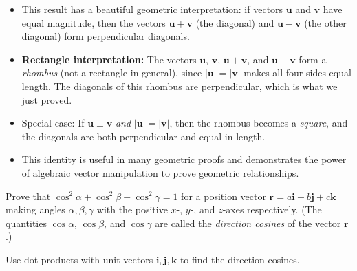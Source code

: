 \begin{takeaways}
\begin{itemize}[leftmargin=*]
\item This result has a beautiful geometric interpretation: if vectors $\mathbf{u}$ and $\mathbf{v}$ have equal magnitude, then the vectors $\mathbf{u} + \mathbf{v}$ (the diagonal) and $\mathbf{u} - \mathbf{v}$ (the other diagonal) form perpendicular diagonals.

\item \textbf{Rectangle interpretation:} The vectors $\mathbf{u}$, $\mathbf{v}$, $\mathbf{u} + \mathbf{v}$, and $\mathbf{u} - \mathbf{v}$ form a \emph{rhombus} (not a rectangle in general), since $|\mathbf{u}| = |\mathbf{v}|$ makes all four sides equal length. The diagonals of this rhombus are perpendicular, which is what we just proved.

\item Special case: If $\mathbf{u} \perp \mathbf{v}$ \emph{and} $|\mathbf{u}| = |\mathbf{v}|$, then the rhombus becomes a \emph{square}, and the diagonals are both perpendicular and equal in length.

\item This identity is useful in many geometric proofs and demonstrates the power of algebraic vector manipulation to prove geometric relationships.
\end{itemize}
\end{takeaways}

\vspace{1em}

\begin{problem}
Prove that $\cos^2\alpha + \cos^2\beta + \cos^2\gamma = 1$ for a position vector $\mathbf{r} = a\mathbf{i} + b\mathbf{j} + c\mathbf{k}$ making angles $\alpha, \beta, \gamma$ with the positive $x$-, $y$-, and $z$-axes respectively. (The quantities $\cos\alpha$, $\cos\beta$, and $\cos\gamma$ are called the \emph{direction cosines} of the vector $\mathbf{r}$.)
\end{problem}

\begin{hint}
Use dot products with unit vectors $\mathbf{i}, \mathbf{j}, \mathbf{k}$ to find the direction cosines.
\end{hint}

